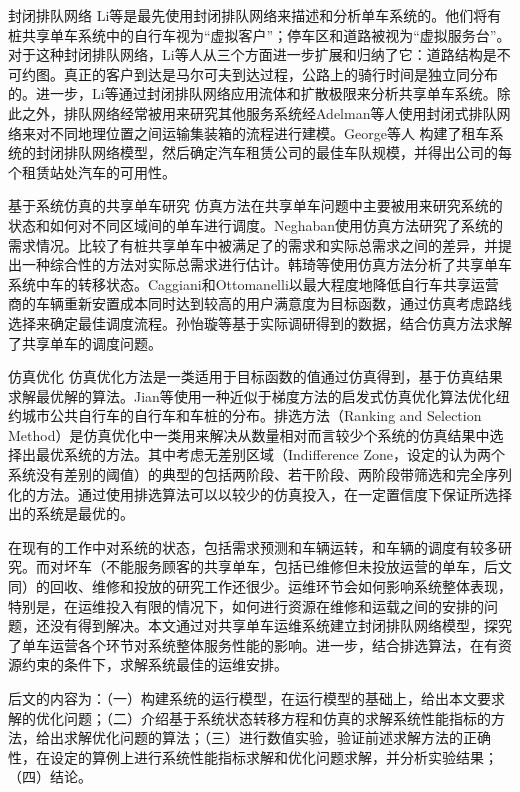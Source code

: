 \documentclass{article}
\begin{document}
封闭排队网络\quad
Li等\cite{2016ALi}是最先使用封闭排队网络来描述和分析单车系统的。他们将有桩共享单车系统中的自行车视为“虚拟客户”；停车区和道路被视为“虚拟服务台”。对于这种封闭排队网络，Li等\cite{2017FluidLi}人从三个方面进一步扩展和归纳了它：道路结构是不可约图。真正的客户到达是马尔可夫到达过程，公路上的骑行时间是独立同分布的。进一步，Li等\cite{2017Li2}通过封闭排队网络应用流体和扩散极限来分析共享单车系统。除此之外，排队网络经常被用来研究其他服务系统经Adelman等人\cite{adelman2007price}使用封闭式排队网络来对不同地理位置之间运输集装箱的流程进行建模。George等人\cite{george2011fleet} 构建了租车系统的封闭排队网络模型，然后确定汽车租赁公司的最佳车队规模，并得出公司的每个租赁站处汽车的可用性。 

基于系统仿真的共享单车研究\quad
仿真方法在共享单车问题中主要被用来研究系统的状态和如何对不同区域间的单车进行调度。Neghaban\cite{2012ASO}使用仿真方法研究了系统的需求情况。比较了有桩共享单车中被满足了的需求和实际总需求之间的差异，并提出一种综合性的方法对实际总需求进行估计。韩琦等使用仿真方法分析了共享单车系统中车的转移状态。Caggiani和Ottomanelli\cite{2018AModeling}以最大程度地降低自行车共享运营商的车辆重新安置成本同时达到较高的用户满意度为目标函数，通过仿真考虑路线选择来确定最佳调度流程。孙怡璇等\cite{孙怡璇2018基于仿真的共享单车调度优化研究}基于实际调研得到的数据，结合仿真方法求解了共享单车的调度问题。

仿真优化\quad 
仿真优化方法是一类适用于目标函数的值通过仿真得到，基于仿真结果求解最优解的算法。Jian等\cite{2017Simulation}使用一种近似于梯度方法的启发式仿真优化算法优化纽约城市公共自行车的自行车和车桩的分布。排选方法（Ranking and Selection Method）是仿真优化中一类用来解决从数量相对而言较少个系统的仿真结果中选择出最优系统的方法。其中考虑无差别区域（Indifference Zone，设定的认为两个系统没有差别的阈值）的典型的包括两阶段\cite{Rinott1978On}、若干阶段\cite{1975Allocation}、两阶段带筛选\cite{2001Simple}和完全序列化的方法\cite{2002KN}。通过使用排选算法可以以较少的仿真投入，在一定置信度下保证所选择出的系统是最优的。

在现有的工作中对系统的状态，包括需求预测和车辆运转，和车辆的调度有较多研究。而对坏车（不能服务顾客的共享单车，包括已维修但未投放运营的单车，后文同）的回收、维修和投放的研究工作还很少。运维环节会如何影响系统整体表现，特别是，在运维投入有限的情况下，如何进行资源在维修和运载之间的安排的问题，还没有得到解决。本文通过对共享单车运维系统建立封闭排队网络模型，探究了单车运营各个环节对系统整体服务性能的影响。进一步，结合排选算法，在有资源约束的条件下，求解系统最佳的运维安排。

后文的内容为：（一）构建系统的运行模型，在运行模型的基础上，给出本文要求解的优化问题；（二）介绍基于系统状态转移方程和仿真的求解系统性能指标的方法，给出求解优化问题的算法；（三）进行数值实验，验证前述求解方法的正确性，在设定的算例上进行系统性能指标求解和优化问题求解，并分析实验结果；（四）结论。
\end{document}
